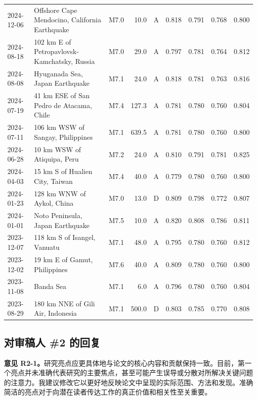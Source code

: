 \documentclass[12pt]{article}
\newcommand{\revcomment}[1]{\begingroup\color{commentcolor}#1\endgroup}
\begin{document}
{\begin{table}[H]
{\begin{tabular}{@{}lllrcrrrr@{}}
2024-12-06 & Offshore Cape Mendocino, California Earthquake       & M7.0 & 10.0  & A & 0.818 & 0.791 & 0.768 & 0.800 \\
2024-08-18 & 102 km E of Petropavlovsk-Kamchatsky, Russia         & M7.0 & 29.0  & A & 0.797 & 0.781 & 0.764 & 0.812 \\
2024-08-08 & Hyuganada Sea, Japan Earthquake                      & M7.1 & 24.0  & A & 0.818 & 0.781 & 0.763 & 0.816 \\
2024-07-19 & 41 km ESE of San Pedro de Atacama, Chile             & M7.4 & 127.3 & A & 0.781 & 0.780 & 0.760 & 0.804 \\
2024-07-11 & 106 km WSW of Sangay, Philippines                    & M7.1 & 639.5 & A & 0.781 & 0.780 & 0.760 & 0.800 \\
2024-06-28 & 10 km WSW of Atiquipa, Peru                          & M7.2 & 24.0  & A & 0.810 & 0.791 & 0.781 & 0.825 \\
2024-04-03 & 15 km S of Hualien City, Taiwan                      & M7.4 & 40.0  & A & 0.779 & 0.780 & 0.760 & 0.800 \\
2024-01-23 & 128 km WNW of Aykol, China                           & M7.0 & 13.0  & D & 0.809 & 0.798 & 0.772 & 0.807 \\
2024-01-01 & Noto Peninsula, Japan Earthquake                     & M7.5 & 10.0  & A & 0.820 & 0.808 & 0.786 & 0.811 \\
2023-12-07 & 118 km S of Isangel, Vanuatu                         & M7.1 & 48.0  & A & 0.795 & 0.780 & 0.760 & 0.812 \\
2023-12-02 & 19 km E of Gamut, Philippines                        & M7.6 & 40.0  & A & 0.809 & 0.780 & 0.760 & 0.800 \\
2023-11-08 & Banda Sea                                            & M7.1 & 6.0   & A & 0.796 & 0.780 & 0.760 & 0.804 \\
2023-08-29 & 180 km NNE of Gili Air, Indonesia                    & M7.1 & 500.0 & D & 0.803 & 0.785 & 0.770 & 0.808 \\
\bottomrule
\end{tabular}%
}
\end{table}
}

\bigskip

\subsection*{对审稿人 \#2 的回复}

\revcomment{%
\textbf{意见 R2-1。}研究亮点应更具体地与论文的核心内容和贡献保持一致。目前，第一个亮点并未准确代表研究的主要焦点，甚至可能产生误导或分散对所解决关键问题的注意力。我建议修改它以更好地反映论文中呈现的实际范围、方法和发现。准确简洁的亮点对于向潜在读者传达工作的真正价值和相关性至关重要。
}
\end{document}
